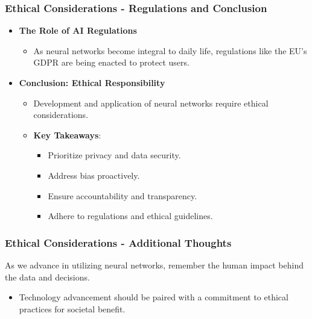 \documentclass[aspectratio=169]{beamer}
\begin{document}
\begin{frame}[fragile]
    \frametitle{Ethical Considerations - Regulations and Conclusion}
    \begin{itemize}
        \item \textbf{The Role of AI Regulations}
            \begin{itemize}
                \item As neural networks become integral to daily life, regulations like the EU’s GDPR are being enacted to protect users.
            \end{itemize}
        \item \textbf{Conclusion: Ethical Responsibility}
            \begin{itemize}
                \item Development and application of neural networks require ethical considerations.
                \item \textbf{Key Takeaways}:
                \begin{itemize}
                    \item Prioritize privacy and data security.
                    \item Address bias proactively.
                    \item Ensure accountability and transparency.
                    \item Adhere to regulations and ethical guidelines.
                \end{itemize}
            \end{itemize}
    \end{itemize}
\end{frame}

\begin{frame}[fragile]
    \frametitle{Ethical Considerations - Additional Thoughts}
    As we advance in utilizing neural networks, remember the human impact behind the data and decisions. 
    \begin{itemize}
        \item Technology advancement should be paired with a commitment to ethical practices for societal benefit.
    \end{itemize}
\end{frame}
\end{document}
